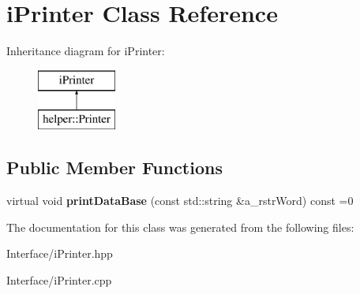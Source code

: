 \hypertarget{classi_printer}{}\section{i\+Printer Class Reference}
\label{classi_printer}
Inheritance diagram for i\+Printer\+:\begin{figure}[H]
\begin{center}
\leavevmode
\includegraphics[height=2.000000cm]{classi_printer}
\end{center}
\end{figure}
\subsection*{Public Member Functions}
\begin{DoxyCompactItemize}
\item 
\mbox{\label{classi_printer_a248ff4109224ea286a621e0d12c41be1}} 
virtual void {\bfseries print\+Data\+Base} (const std\+::string \&a\+\_\+rstr\+Word) const =0
\end{DoxyCompactItemize}


The documentation for this class was generated from the following files\+:\begin{DoxyCompactItemize}
\item 
Interface/i\+Printer.\+hpp\item 
Interface/i\+Printer.\+cpp\end{DoxyCompactItemize}
